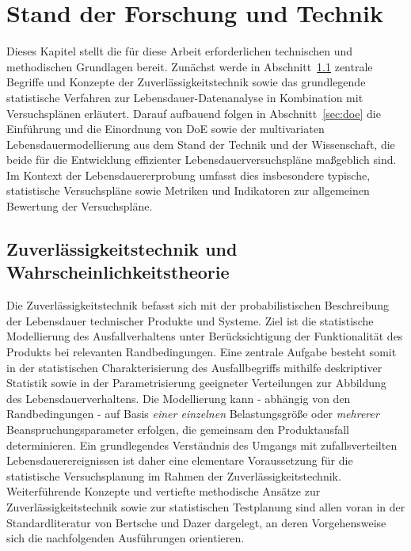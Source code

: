 \chapter{Stand der Forschung und Technik} \label{chap:stand}

Dieses Kapitel stellt die für diese Arbeit erforderlichen technischen und methodischen Grundlagen bereit. Zunächst werde in Abschnitt~\ref{sec:zuv} zentrale Begriffe und Konzepte der Zuverlässigkeitstechnik sowie das grundlegende statistische Verfahren zur Lebensdauer-Datenanalyse in Kombination mit Versuchsplänen erläutert.
Darauf aufbauend folgen in Abschnitt~\ref{sec:doe} die Einführung und die Einordnung von \acs{DoE} sowie der multivariaten Lebensdauermodellierung aus dem Stand der Technik und der Wissenschaft, die beide für die Entwicklung effizienter Lebensdauerversuchspläne maßgeblich sind.
Im Kontext der Lebensdauererprobung umfasst dies insbesondere typische, statistische Versuchspläne sowie Metriken und Indikatoren zur allgemeinen Bewertung der Versuchspläne.

\section{Zuverlässigkeitstechnik und Wahrscheinlichkeitstheorie} \label{sec:zuv}
Die Zuverlässigkeitstechnik befasst sich mit der probabilistischen Beschreibung der Lebensdauer technischer Produkte und Systeme.
Ziel ist die statistische Modellierung des Ausfallverhaltens unter Berücksichtigung der Funktionalität des Produkts bei relevanten Randbedingungen.
Eine zentrale Aufgabe besteht somit in der statistischen Charakterisierung des Ausfallbegriffs mithilfe deskriptiver Statistik sowie in der Parametrisierung geeigneter Verteilungen zur Abbildung des Lebensdauerverhaltens.
Die Modellierung kann - abhängig von den Randbedingungen - auf Basis \textit{einer einzelnen} Belastungsgröße oder \textit{mehrerer} Beanspruchungsparameter erfolgen, die gemeinsam den Produktausfall determinieren.
Ein grundlegendes Verständnis des Umgangs mit zufallsverteilten Lebensdauerereignissen ist daher eine elementare Voraussetzung für die statistische Versuchsplanung im Rahmen der Zuverlässigkeitstechnik.
Weiterführende Konzepte und vertiefte methodische Ansätze zur Zuverlässigkeitstechnik sowie zur statistischen Testplanung sind allen voran in der Standardliteratur von Bertsche und Dazer \cite{Bertsche.2022} dargelegt, an deren Vorgehensweise sich die nachfolgenden Ausführungen orientieren.

